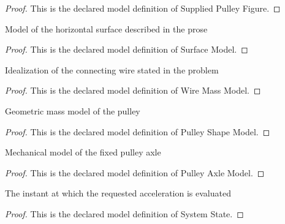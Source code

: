 \begin{proof}
  This is the declared model definition of Supplied Pulley Figure.
\end{proof}
\begin{definition}
  \label{def:physics:phyx-mini-0778:phyxminiproblems-problemphyxmini0778-surfacemodel}
  Model of the horizontal surface described in the prose
\end{definition}
\begin{proof}
  This is the declared model definition of Surface Model.
\end{proof}
\begin{definition}
  \label{def:physics:phyx-mini-0778:phyxminiproblems-problemphyxmini0778-wiremassmodel}
  Idealization of the connecting wire stated in the problem
\end{definition}
\begin{proof}
  This is the declared model definition of Wire Mass Model.
\end{proof}
\begin{definition}
  \label{def:physics:phyx-mini-0778:phyxminiproblems-problemphyxmini0778-pulleyshapemodel}
  Geometric mass model of the pulley
\end{definition}
\begin{proof}
  This is the declared model definition of Pulley Shape Model.
\end{proof}
\begin{definition}
  \label{def:physics:phyx-mini-0778:phyxminiproblems-problemphyxmini0778-pulleyaxlemodel}
  Mechanical model of the fixed pulley axle
\end{definition}
\begin{proof}
  This is the declared model definition of Pulley Axle Model.
\end{proof}
\begin{definition}
  \label{def:physics:phyx-mini-0778:phyxminiproblems-problemphyxmini0778-systemstate}
  The instant at which the requested acceleration is evaluated
\end{definition}
\begin{proof}
  This is the declared model definition of System State.
\end{proof}
